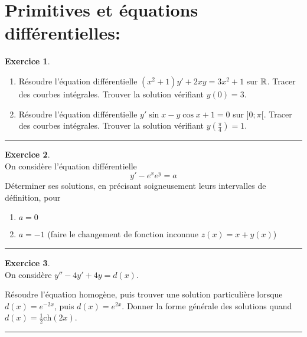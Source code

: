\documentclass[a4paper,11pt]{article}
\theoremstyle{definition}
\newtheorem{exo}{Exercice} %
\begin{document}
\begin{minipage}{1\linewidth}
\begin{minipage}[t]{0.48\linewidth}
	
		
	\end{minipage}	
	\hfill\vrule\hfill
	\begin{minipage}[t]{0.48\linewidth}
		\raggedright
	\section*{Primitives et équations différentielles:}%
	\begin{exo}\textit{}\quad\\[0.25cm]
		\begin{enumerate}
			\item Résoudre l'équation différentielle $(x^2+1)y'+2xy=3x^2+1$ sur $\mathbb{R}$.
			Tracer des courbes intégrales. Trouver la solution vérifiant $y(0) = 3$.
			
			
			\item Résoudre l'équation différentielle $y'\sin x-y\cos x+1=0$ sur $]0;\pi[$.
			Tracer des courbes intégrales. Trouver la solution vérifiant $y(\frac\pi4) = 1$.
			
		\end{enumerate}
		
		
		\centering
		\rule{1\linewidth}{0.6pt}
	\end{exo}
	
	
	
	\begin{exo}\textit{}\quad\\
		On considère l'équation différentielle
		$$y'-e^xe^y=a$$
		Déterminer ses solutions, en précisant soigneusement leurs intervalles de définition, pour
		\begin{enumerate}
			\item $a=0$
			\item $a=-1$ (faire le changement de fonction inconnue $z(x)=x+y(x)$)
		\end{enumerate}
		
		\centering
		\rule{1\linewidth}{0.6pt}
	\end{exo}
	
	\begin{exo}\quad\\
		On considère $y''-4y'+4y=d(x)$. 
		
		Résoudre l'équation homogène, puis trouver une solution particulière 
		lorsque $d(x)=e^{-2x}$, puis $d(x)=e^{2x}$. 
		Donner la forme générale des solutions quand $d(x)=\frac{1}{2} \text{ch}(2x)$.
		
		\centering
		\rule{1\linewidth}{0.6pt}
	\end{exo}
		
		
		
		
	\end{minipage}
\end{minipage}



		
	
		
		
\end{document}
